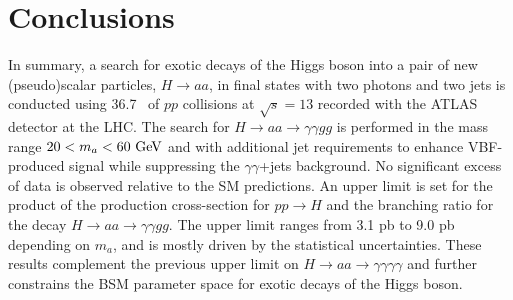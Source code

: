 \section{Conclusions}

In summary, a search for exotic decays of the Higgs boson into a pair of new (pseudo)scalar particles,
$H\to aa$, in final states with two photons 
and two jets is conducted using 36.7~\ifb{} of $pp$ collisions at $\sqrt{s}=13$ \TeV{} recorded 
with the ATLAS detector at the LHC. The search for $H\to aa \to \gamma\gamma gg$ is performed
in the mass range $20 < m_a < 60~\mathrm{GeV}{}$ and with additional jet requirements 
to enhance VBF-produced signal while suppressing the $\gamma\gamma$+jets background.
No significant excess of data is observed relative to the SM predictions. An upper limit
is set for the product of the production cross-section for $pp\to H$ and the branching
ratio for the decay $H\to aa\to\gamma\gamma gg$. The upper limit ranges from 3.1 pb to 9.0 pb depending
on $m_a$, and is mostly driven by the statistical uncertainties.
These results complement the previous upper limit on $H\to aa\to\gamma\gamma\gamma\gamma$ and
further constrains the BSM parameter space for exotic decays of the Higgs boson.

%
